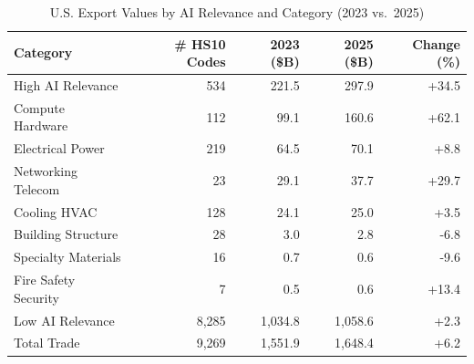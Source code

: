 \begin{table}[htbp]
\centering
\caption{U.S. Export Values by AI Relevance and Category (2023 vs.\ 2025)}
\label{tab:trade_hierarchical_exports}
\setlength{\tabcolsep}{4.5mm}
\renewcommand{\arraystretch}{1.60}
\begin{tabular}{lrrrr}
\toprule
Category & \# HS10 Codes & 2023 (\$B) & 2025 (\$B) & Change (\%) \\
\midrule
High AI Relevance & 534 & 221.5 & 297.9 & +34.5 \\
\quad\quad Compute Hardware & 112 & 99.1 & 160.6 & +62.1 \\
\quad\quad Electrical Power & 219 & 64.5 & 70.1 & +8.8 \\
\quad\quad Networking Telecom & 23 & 29.1 & 37.7 & +29.7 \\
\quad\quad Cooling HVAC & 128 & 24.1 & 25.0 & +3.5 \\
\quad\quad Building Structure & 28 & 3.0 & 2.8 & -6.8 \\
\quad\quad Specialty Materials & 16 & 0.7 & 0.6 & -9.6 \\
\quad\quad Fire Safety Security & 7 & 0.5 & 0.6 & +13.4 \\
Low AI Relevance & 8,285 & 1,034.8 & 1,058.6 & +2.3 \\
\midrule
Total Trade & 9,269 & 1,551.9 & 1,648.4 & +6.2 \\
\bottomrule
\end{tabular}
\end{table}
